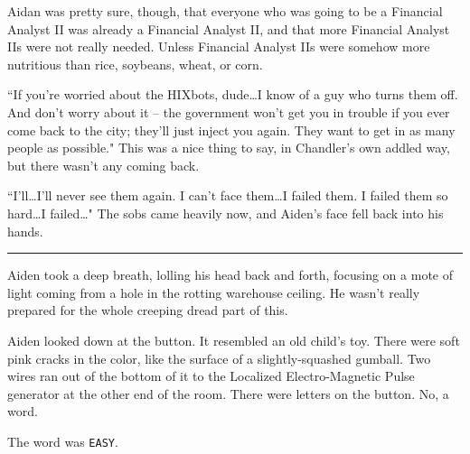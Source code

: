 \documentclass[11pt]{book}
\begin{document}
	Aidan was pretty sure, though, that everyone who was going to be a Financial Analyst II was already a Financial Analyst II, and that more Financial Analyst IIs were not really needed. Unless Financial Analyst IIs were somehow more nutritious than rice, soybeans, wheat, or corn.
		
	``If you're worried about the HIXbots, dude\dots I know of a guy who turns them off. And don't worry about it -- the government won't get you in trouble if you ever come back to the city; they'll just inject you again. They want to get in as many people as possible." This was a nice thing to say, in Chandler's own addled way, but there wasn't any coming back.
	
	``I'll\dots I'll never see them again. I can't face them\dots I failed them. I failed them so hard\dots I failed\dots" The sobs came heavily now, and Aiden's face fell back into his hands.
	
	\vspace{0.5cm}
	\hrule
	\vspace{0.5cm}
	
	Aiden took a deep breath, lolling his head back and forth, focusing on a mote of light coming from a hole in the rotting warehouse ceiling. He wasn't really prepared for the whole creeping dread part of this.
	
	Aiden looked down at the button. It resembled an old child's toy. There were soft pink cracks in the color, like the surface of a slightly-squashed gumball. Two wires ran out of the bottom of it to the Localized Electro-Magnetic Pulse generator at the other end of the room. There were letters on the button. No, a word.
	
	The word was \texttt{EASY}.
	
\end{document}
